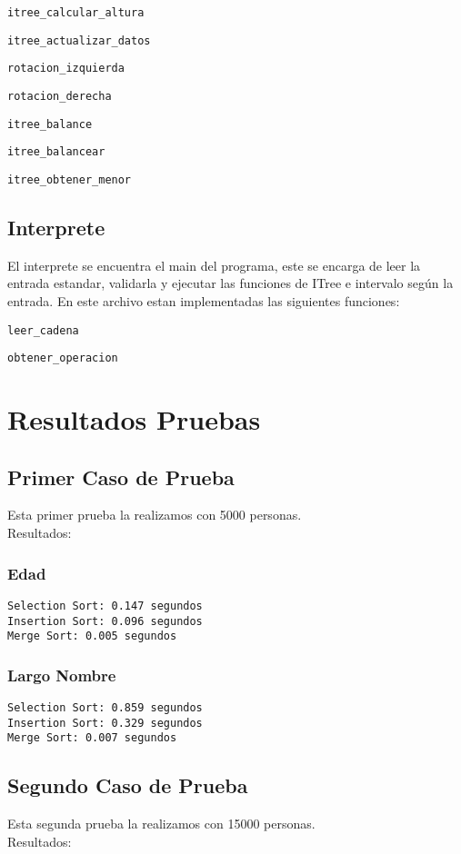 \documentclass[]{article}
\begin{document}
\verb|itree_calcular_altura|

\verb|itree_actualizar_datos|

\verb|rotacion_izquierda|

\verb|rotacion_derecha|

\verb|itree_balance|

\verb|itree_balancear|

\verb|itree_obtener_menor|

\subsection{Interprete}
El interprete se encuentra el main del programa, este se encarga de leer la entrada estandar, validarla y ejecutar las funciones de ITree e intervalo según la entrada. En este archivo estan implementadas las siguientes funciones:

\verb|leer_cadena|

\verb|obtener_operacion|
\section{Resultados Pruebas}
\subsection{Primer Caso de Prueba}
Esta primer prueba la realizamos con 5000 personas.\\
Resultados:

\subsubsection{Edad}
\verb|Selection Sort: 0.147 segundos|\\
\verb|Insertion Sort: 0.096 segundos|\\
\verb|Merge Sort: 0.005 segundos|\\
\subsubsection{Largo Nombre}
\verb|Selection Sort: 0.859 segundos|\\
\verb|Insertion Sort: 0.329 segundos|\\
\verb|Merge Sort: 0.007 segundos|\\
\subsection{Segundo Caso de Prueba}
Esta segunda prueba la realizamos con 15000 personas.\\
Resultados:
\end{document}
